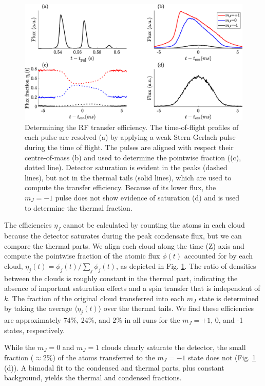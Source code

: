 	\begin{figure}[!t]
	\begin{center}
		\includegraphics[width=\columnwidth]{fig/depletion/frac_cal_profile}
		\caption{Determining the RF transfer efficiency. The time-of-flight profiles of each pulse are resolved (a) by applying a weak Stern-Gerlach pulse during the time of flight. The pulses are aligned with respect their centre-of-mass (b) and used to determine the pointwise fraction ((c), dotted line). Detector saturation is evident in the peaks (dashed lines), but not in the thermal tails (solid lines), which are used to compute the transfer efficiency. Because of its lower flux, the $m_J=-1$ pulse does not show evidence of saturation (d) and is used to determine the thermal fraction.}
		\label{fig:frac_cal}
	\end{center}
	\end{figure}

	The efficiencies $\eta_J$ cannot be calculated by counting the atoms in each cloud because the detector saturates during the peak condensate flux, but we can compare the thermal parts. 
	We align each cloud along the time (Z) axis and compute the pointwise fraction of the atomic flux $\phi(t)$ accounted for by each cloud, $\eta_j(t) = \phi_j(t)/\sum_j\phi_j(t)$, as depicted in Fig. \ref{fig:frac_cal}. 
	The ratio of densities between the clouds is roughly constant in the thermal part, indicating the absence of important saturation effects and a spin transfer that is independent of $k$. 
	The fraction of the original cloud transferred into each $m_J$ state is determined by taking the average $\langle\eta_j(t)\rangle$ over the thermal tails. 
	We find these efficiencies are approximately 74\%, 24\%, and 2\% in all runs for the $m_J=+1$, 0, and -1 states, respectively.
	
	While the $m_J=0$ and $m_J=1$ clouds clearly saturate the detector, the small fraction ($\approx2\%$) of the atoms transferred to the $m_J=-1$ state does not (Fig. \ref{fig:frac_cal} (d)). 
	A bimodal fit to the condensed and thermal parts, plus constant background, yields the thermal and condensed fractions.

